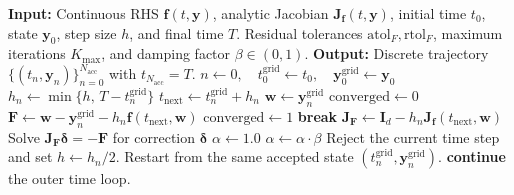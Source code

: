 \documentclass[11pt,a4paper]{article}
\theoremstyle{definition}
\theoremstyle{remark}
\begin{document}
\begin{algorithm}[htbp]
\caption{Implicit Euler Integration with Damped Newton Solver}
\label{alg:implicit_euler_newton}
\footnotesize
\begin{algorithmic}[1]
\STATE \textbf{Input:} Continuous RHS $\mathbf{f}(t,\mathbf{y})$, analytic Jacobian $\mathbf{J}_{\mathbf f}(t,\mathbf{y})$, initial time $t_0$, state $\mathbf{y}_0$, step size $h$, and final time $T$.
\STATE \hspace{\algorithmicindent}Residual tolerances $\mathrm{atol}_F,\mathrm{rtol}_F$, maximum iterations $K_{\max}$, and damping factor $\beta\in(0,1)$.
\STATE \textbf{Output:} Discrete trajectory $\{(t_n,\mathbf{y}_n)\}_{n=0}^{N_{\mathrm{acc}}}$ with $t_{N_{\mathrm{acc}}}=T$.
\STATE $n \gets 0,\quad t_0^{\mathrm{grid}} \gets t_0,\quad \mathbf{y}_0^{\mathrm{grid}} \gets \mathbf{y}_0$
    \STATE $h_n \gets \min\{h,\,T-t_n^{\mathrm{grid}}\}$ 
    \STATE $t_{\mathrm{next}} \gets t_n^{\mathrm{grid}} + h_n$
    \STATE $\mathbf{w} \gets \mathbf{y}_n^{\mathrm{grid}}$ 
    \STATE $\text{converged} \gets 0$
        \STATE $\mathbf{F} \gets \mathbf{w} - \mathbf{y}_n^{\mathrm{grid}} - h_n \mathbf{f}(t_{\text{next}}, \mathbf{w})$
            \STATE $\text{converged} \gets 1$
            \STATE \textbf{break}
        \ENDIF
        \STATE $\mathbf{J}_{\mathbf{F}} \gets \mathbf{I}_d - h_n \mathbf{J}_{\mathbf{f}}(t_{\text{next}}, \mathbf{w})$
        \STATE Solve $\mathbf{J}_{\mathbf{F}} \boldsymbol{\delta} = -\mathbf{F}$ for correction $\boldsymbol{\delta}$
        \STATE $\alpha \gets 1.0$ 
            \STATE $\alpha \gets \alpha \cdot \beta$ 
        \ENDWHILE
            \STATE Reject the current time step and set $h\gets h_n/2$.
            \STATE Restart from the same accepted state $(t_n^{\mathrm{grid}},\mathbf{y}_n^{\mathrm{grid}})$.
            \STATE \textbf{continue} the outer time loop.

\end{algorithmic}
\end{algorithm}
\end{document}
